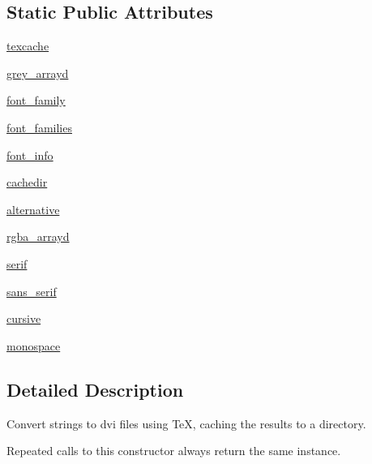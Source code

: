 \subsection*{Static Public Attributes}
\begin{DoxyCompactItemize}
\item 
\hyperlink{classmatplotlib_1_1texmanager_1_1TexManager_a06fa2b016e6f2260ef00bebfbb371dc5}{texcache}
\item 
\hyperlink{classmatplotlib_1_1texmanager_1_1TexManager_a7781a7dcd4b3925ea01b3150a43c11bd}{grey\+\_\+arrayd}
\item 
\hyperlink{classmatplotlib_1_1texmanager_1_1TexManager_afacb3c497bd15bb5d63f328218dbb607}{font\+\_\+family}
\item 
\hyperlink{classmatplotlib_1_1texmanager_1_1TexManager_a31f472221b0723b1e6166ebab1f605f9}{font\+\_\+families}
\item 
\hyperlink{classmatplotlib_1_1texmanager_1_1TexManager_abee39c52ddf6bb863522c63878321ed8}{font\+\_\+info}
\item 
\hyperlink{classmatplotlib_1_1texmanager_1_1TexManager_abf407afa7677966c90af4c20ab4c3320}{cachedir}
\item 
\hyperlink{classmatplotlib_1_1texmanager_1_1TexManager_ac5ff9dc5595d9c2905d05903fb0336a7}{alternative}
\item 
\hyperlink{classmatplotlib_1_1texmanager_1_1TexManager_a1f7d89f598848cc54b5b129fb478e8cd}{rgba\+\_\+arrayd}
\item 
\hyperlink{classmatplotlib_1_1texmanager_1_1TexManager_aa0f9b51391e65124424855e74a07dda6}{serif}
\item 
\hyperlink{classmatplotlib_1_1texmanager_1_1TexManager_aa6263bc162fc007f3c2377c9bf795a07}{sans\+\_\+serif}
\item 
\hyperlink{classmatplotlib_1_1texmanager_1_1TexManager_abb9a2a2bc9d53b29e9e7a10297c90527}{cursive}
\item 
\hyperlink{classmatplotlib_1_1texmanager_1_1TexManager_a3d946b86a7d15b4316b7d0a0c9e149fb}{monospace}
\end{DoxyCompactItemize}


\subsection{Detailed Description}
\begin{DoxyVerb}Convert strings to dvi files using TeX, caching the results to a directory.

Repeated calls to this constructor always return the same instance.
\end{DoxyVerb}
 


